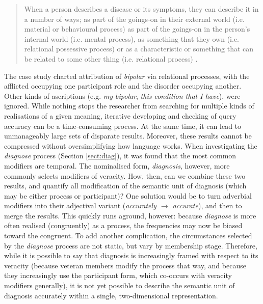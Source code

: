 \begin{quote} \small \singlespacing
When a person describes a disease or its symptoms, they can describe it in a number of ways; as part of the goings\hyp{}on in their external world (i.e. material or behavioural process) as part of the goings\hyp{}on in the person's internal world (i.e. mental process), as something that they own (i.e. relational possessive process) or as a characteristic or something that can be related to some other thing (i.e. relational process) \parencite*[p.~290]{slade_emergency_2008}.
\end{quote}
%
The case study charted attribution of \emph{bipolar} via relational processes, with the afflicted occupying one participant role and the disorder occupying another. Other kinds of ascriptions (e.g. \emph{my bipolar}, \emph{this condition that I have}), were ignored. While nothing stops the researcher from searching for multiple kinds of realisations of a given meaning, iterative developing and checking of query accuracy can be a time\hyp{}consuming process. At the same time, it can lead to unmanageably large sets of disparate results. Moreover, these results cannot be compressed without oversimplifying how language works. When investigating the \emph{diagnose} process (Section \ref{sect:diag}), it was found that the most common modifiers are temporal. The nominalised form, \emph{diagnosis}, however, more commonly selects modifiers of veracity. How, then, can we combine these two results, and quantify all modification of the semantic unit of diagnosis (which may be either process or participant)? One solution would be to turn adverbial modifiers into their adjectival variant (\emph{accurately $\rightarrow$ accurate}), and then to merge the results. This quickly runs aground, however: because \emph{diagnose} is more often realised (congruently) as a process, the frequencies may now be biased toward the congruent. To add another complication, the circumstances selected by the \emph{diagnose} process are not static, but vary by membership stage. Therefore, while it is possible to say that diagnosis is increasingly framed with respect to its veracity (because veteran \glspl{member} modify the process that way, and because they increasingly use the participant form, which co\hyp{}occurs with veracity modifiers generally), it is not yet possible to describe the semantic unit of diagnosis accurately within a single, two\hyp{}dimensional representation.

